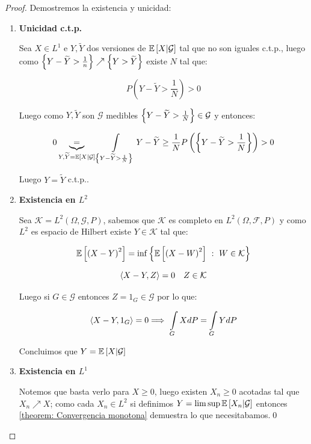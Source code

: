 \begin{proof}
	Demostremos la existencia y unicidad:
	
	\begin{enumerate}
		\item {\textbf{Unicidad c.t.p.}}
		
		Sea $X \in L^1$ e $Y,\widetilde{Y}$ dos versiones de $\mathbb{E} \left[X \vert \mathcal{G}\right]$ tal que no son iguales c.t.p., luego como $\left\lbrace Y - \widetilde{Y} > \frac{1}{n}\right\rbrace \nearrow \left\lbrace Y > \widetilde{Y}\right\rbrace$ existe $N$ tal que:
		
		\begin{equation*}
			P\left(Y - \widetilde{Y} > \frac{1}{N}\right) > 0
		\end{equation*}
		
		Luego como $Y, \widetilde{Y}$ son $\mathcal{G}$ medibles $\left\lbrace Y - \widetilde{Y} > \frac{1}{N}\right\rbrace \in \mathcal{G}$ y entonces:
		
		\begin{equation*}
			0 \underbrace{=}_{Y,\widetilde{Y} = \mathbb{E} \left[X \vert \mathcal{G}\right]} \int\limits_{\left\lbrace Y - \widetilde{Y} > \frac{1}{N}\right\rbrace} {Y - \widetilde{Y}} \geq \frac{1}{N} P \left(\left\lbrace Y - \widetilde{Y} > \frac{1}{N}\right\rbrace\right) > 0
		\end{equation*}
		
		Luego $Y = \widetilde{Y}$ c.t.p..
		
		\item {\textbf{Existencia en $L^2$}}
		
		Sea $\mathcal{K} = L^2(\Omega, \mathcal{G}, P)$, sabemos que $\mathcal{K} $ es completo en $L^2(\Omega, \mathcal{F}, P)$ y como $L^2$ es espacio de Hilbert existe $Y \in \mathcal{K} $ tal que:
		
		\begin{equation*}
			\mathbb{E} \left[\left(X - Y \right)^2\right] = \inf \left\lbrace\mathbb{E} \left[\left(X - W \right)^2\right] ~:~ W \in \mathcal{K}\right\rbrace
		\end{equation*}
		
		\begin{equation*}
			\left\langle X-Y, Z\right\rangle = 0 \quad Z \in \mathcal{K}
		\end{equation*}
		
		Luego si $G \in \mathcal{G}$ entonces $Z = 1_{G} \in \mathcal{G}$ por lo que:
		
		\begin{equation*}
			\ip{X-Y, 1_G} = 0 \Longrightarrow \ \int\limits_{G} {XdP} = \int\limits_{G}{Y dP}
		\end{equation*}
		
		Concluimos que $Y = \mathbb{E} \left[X \vert \mathcal{G}\right]$
		
		\item {\textbf{Existencia en $L^1$}}		
		
		Notemos que basta verlo para $X \geq 0$, luego existen $X_n \geq 0$ acotadas tal que $X_n \nearrow X$; como cada $X_n \in L^2$ si definimos $Y = \limsup \mathbb{E} \left[X_n \vert \mathcal{G}\right]$ entonces \ref{theorem: Convergencia monotona} demuestra lo que necesitabamos.\qed
		
	\end{enumerate}
	
\end{proof}

